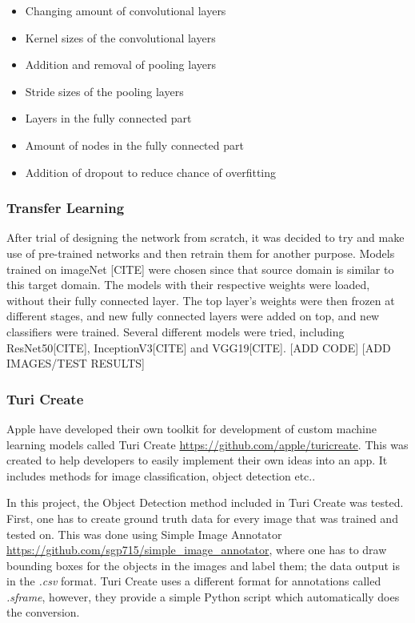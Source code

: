 \begin{itemize}
\item Changing amount of convolutional layers
\item Kernel sizes of the convolutional layers
\item Addition and removal of pooling layers
\item Stride sizes of the pooling layers
\item Layers in the fully connected part
\item Amount of nodes in the fully connected part
\item Addition of dropout to reduce chance of overfitting 
\end{itemize}

\subsubsection{Transfer Learning}
After trial of designing the network from scratch, it was decided to try and make use of pre-trained networks and then retrain them for another purpose. Models trained on imageNet [CITE] were chosen since that source domain is similar to this target domain. The models with their respective weights were loaded, without their fully connected layer. The top layer's weights were then frozen at different stages, and new fully connected layers were added on top, and new classifiers were trained. 
Several different models were tried, including ResNet50[CITE], InceptionV3[CITE] and VGG19[CITE].
[ADD CODE]
[ADD IMAGES/TEST RESULTS]

\subsubsection{Turi Create}
Apple have developed their own toolkit for development of custom machine learning models called Turi Create \url{https://github.com/apple/turicreate}. This was created to help developers to easily implement their own ideas into an app. It includes methods for image classification, object detection etc.. 

In this project, the Object Detection method included in Turi Create was tested. First, one has to create ground truth data for every image that was trained and tested on. This was done using Simple Image Annotator \url{https://github.com/sgp715/simple_image_annotator}, where one has to draw bounding boxes for the objects in the images and label them; the data output is in the \textit{.csv} format.  Turi Create uses a different format for annotations called \textit{.sframe}, however, they provide a simple Python script which automatically does the conversion. 

